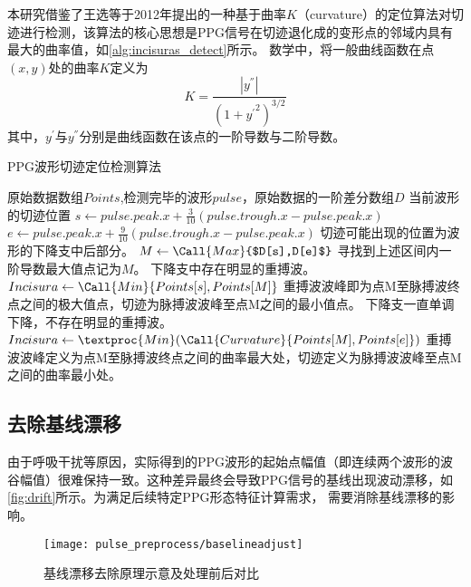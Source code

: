 本研究借鉴了王选等\cite{Wang2012}于2012年提出的一种基于曲率$K$（curvature）的定位算法对切迹进行检测，该算法的核心思想是PPG信号在切迹退化成的变形点的邻域内具有最大的曲率值，如\autoref{alg:incisuras_detect}所示。
数学中，将一般曲线函数在点$(x,y)$处的曲率$K$定义为
\begin{equation}
    \label{equ:curvature}
    K=\frac{|y^{''}|}{{(1+{y^{'}}^2)}^{3/2}}
\end{equation}
其中，$y^{'}$与$y^{''}$分别是曲线函数在该点的一阶导数与二阶导数。

\begin{breakablealgorithm}
    \caption{PPG波形切迹定位检测算法}
    \label{alg:incisuras_detect}
    \begin{algorithmic}[1] %
        \Require 原始数据数组$Points$,检测完毕的波形$pulse$，原始数据的一阶差分数组$D$
        \Ensure 当前波形的切迹位置
            \State $s \gets pulse.peak.x + \frac{3}{10}(pulse.trough.x-pulse.peak.x)$
            \State $e \gets pulse.peak.x + \frac{9}{10}(pulse.trough.x-pulse.peak.x)$
            \State \Comment 切迹可能出现的位置为波形的下降支中后部分。
            \State $M  \gets \Call{Max}{$D[s],D[e]$}$
            \State \Comment 寻找到上述区间内一阶导数最大值点记为$M$。
                \State \Comment 下降支中存在明显的重搏波。
                \State $Incisura \gets \Call{Min}{Points[s],Points[M]}$
                \State \Comment 重搏波波峰即为点M至脉搏波终点之间的极大值点，切迹为脉搏波波峰至点M之间的最小值点。
            \Else
                \State \Comment 下降支一直单调下降，不存在明显的重搏波。
                \State $Incisura \gets \textproc{Min}({\Call{Curvature}{Points[M],Points[e]}})$
                \State \Comment 重搏波波峰定义为点M至脉搏波终点之间的曲率最大处，切迹定义为脉搏波波峰至点M之间的曲率最小处。
            \EndIf
            \State {}
        \EndFunction
    \end{algorithmic}
\end{breakablealgorithm}

\subsection{去除基线漂移}
由于呼吸干扰等原因，实际得到的PPG波形的起始点幅值（即连续两个波形的波谷幅值）很难保持一致。这种差异最终会导致PPG信号的基线出现波动漂移，如\autoref{fig:drift}所示。为满足后续特定PPG形态特征计算需求，
需要消除基线漂移的影响。
\begin{figure}[htbp]
    \centering
    \texttt{[image: pulse\_preprocess/baselineadjust]}
    \caption{\label{fig:drift}基线漂移去除原理示意及处理前后对比}
\end{figure}

